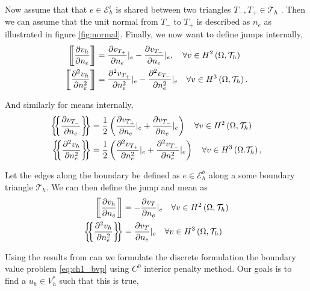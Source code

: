 Now assume that that $e \in \mathcal{E}_{h}^{i} $ is shared between two triangles $T_{-}, T_{+} \in  \mathcal{T} _{h}$ .
Then we can assume that the unit normal from $T_{-}$ to $T_{+}$ is described as $n_{e}$ as illustrated in figure
\ref{fig:normal}. Finally, we now want to define jumps internally, \[
\begin{split}
    \jump{ \frac{\partial v_{h}}{\partial n_{e}} } &= \frac{\partial v_{T_{+}}}{\partial n_{e}  } | _{e} -
    \frac{\partial v_{T_{-}}}{\partial n_{e}  } |_{e}, \quad \forall v \in H^{2}\left( \Omega , \mathcal{T} _{h} \right)  \\
    \jump{ \frac{\partial ^2 v_{h}}{\partial n_{e} ^2 } } &= \frac{\partial ^2 v_{T_{+}}}{\partial  n_{e}^2} |_{e}  -
    \frac{\partial ^2 v_{T_{-}}}{\partial n_{e}^2   } |_{e} \quad \forall v \in H^3\left( \Omega , \mathcal{T} _{h}
    \right).  \\
\end{split}
\]

And similarly for means internally,
\[
    \begin{split}
\mean{ \frac{\partial v_{T_{-}}}{\partial n_{e} } } &= \frac{1}{2} \left( \frac{\partial v_{T_{+}}}{\partial n_{e} }
|_{e} +  \frac{\partial v_{T_{-}}}{\partial n_{e} } |_{e}  \right) \quad  \forall v \in H^2\left( \Omega , \mathcal{T}
_{h} \right) \\
    \mean{ \frac{\partial ^2 v_{h}}{\partial n_{e}^2 } } &= \frac{1}{2} \left( \frac{\partial ^2 v_{T_{+}}}{\partial
    n_{e}^2  } |_{e} + \frac{\partial ^2 v_{T_{-}}}{\partial n_{e}^2  } |_{e}    \right) \quad \forall v \in  H^3\left( \Omega .
\mathcal{T}_{h}  \right), \\
    \end{split}
\]

Let the edges along the boundary be defined as $e \in  \mathcal{E} _{h}^{b}$ along a some boundary triangle $\mathcal{T}
_{h}$. We can then define the jump and mean as \[
\begin{split}
    \jump{ \frac{\partial v_{h} }{\partial n_{e} } } & = -\frac{\partial v_{T}}{\partial  n_{e}} |_{e} \quad \forall v \in
    H^2\left( \Omega , \mathcal{T}_{h}  \right) \\
    \mean{ \frac{\partial ^2 v_{h}}{\partial n_{e}^2 } } & = \frac{\partial v_{T}}{\partial  n_{e}} |_{e} \quad \forall v \in
    H^3\left( \Omega  , \mathcal{T}_{h}  \right)
\end{split}
\]

Using the results from \cite{gu2012c0} can we formulate the discrete formulation the boundary value problem
\eqref{eq:ch1_bvp} using $C^{0}$ interior penalty method. Our goals is to find a $u_{h} \in V_{h}^{*} $ such that this
is true,

